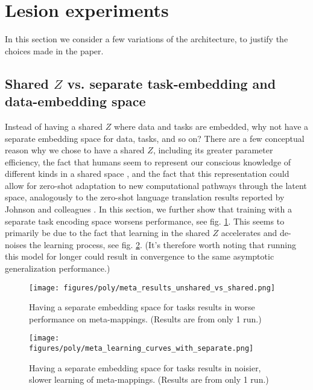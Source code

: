 \section{Lesion experiments} \label{app_lesion_results}
In this section we consider a few variations of the architecture, to justify the choices made in the paper.

\subsection{Shared $Z$ vs. separate task-embedding and data-embedding space} \label{app_lesion_results_shared_z}
Instead of having a shared $Z$ where data and tasks are embedded, why not have a separate embedding space for data, tasks, and so on? There are a few conceptual reason why we chose to have a shared $Z$, including its greater parameter efficiency, the fact that humans seem to represent our conscious knowledge of different kinds in a shared space \citep[][]{Baars2005}, and the fact that this representation could allow for zero-shot adaptation to new computational pathways through the latent space, analogously to the zero-shot language translation results reported by Johnson and colleagues \citep{Johnson2016a}. In this section, we further show that training with a separate task encoding space worsens performance, see fig. \ref{supp_lesion_shared_z_fig}. This seems to primarily be due to the fact that learning in the shared $Z$ accelerates and de-noises the learning process, see fig. \ref{supp_lesion_shared_z_learn_fig}. (It's therefore worth noting that running this model for longer could result in convergence to the same asymptotic generalization performance.) \par
\begin{figure}[H]
\centering
\texttt{[image: figures/poly/meta\_results\_unshared\_vs\_shared.png]}
\caption{Having a separate embedding space for tasks results in worse performance on meta-mappings. (Results are from only 1 run.)}
\label{supp_lesion_shared_z_fig}
\end{figure}
\begin{figure}[H]
\centering
\texttt{[image: figures/poly/meta\_learning\_curves\_with\_separate.png]}
\caption{Having a separate embedding space for tasks results in noisier, slower learning of meta-mappings. (Results are from only 1 run.)}
\label{supp_lesion_shared_z_learn_fig}
\end{figure}

